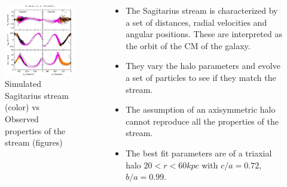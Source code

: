 \documentclass[xcolor=dvipsnames]{beamer}
\begin{document}
\begin{frame}

\begin{columns}[c]

\begin{column}{.5\textwidth}
\begin{figure}
\includegraphics[width=1\linewidth]{./pics/sagStream.png}
\caption{\tiny Simulated Sagitarius stream (color) vs Observed properties of the stream (figures)}
\end{figure}
\end{column}

\begin{column}{.6\textwidth}
\centering
\small
\begin{itemize}

\item The Sagitarius stream is characterized by a set of distances, radial velocities and angular positions. These are interpreted as the orbit of the CM of the galaxy.

\item They vary the halo parameters and evolve a set of particles to see if they match the stream.

\item The assumption of an axisymmetric halo cannot reproduce all the properties of the stream.

\item The best fit parameters are of a triaxial halo $20<r<60 kpc$ with $c/a = 0.72$, $b/a = 0.99$. 

\end{itemize}

\end{column}

\end{columns}

\end{frame}
\end{document}
